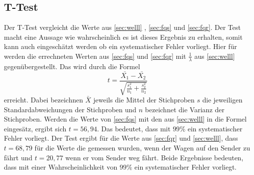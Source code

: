 \subsection{T-Test}
Der T-Test vergleicht die Werte aus \ref{sec:welll} , \ref{sec:fqs} und
\ref{sec:fqr}. Der Test macht eine Aussage wie wahrscheinlich es ist dieses
Ergebnis zu erhalten, somit kann auch eingeschätzt werden ob ein systematischer
Fehler vorliegt. Hier für werden die errechneten Werten aus \ref{sec:fqs}
und \ref{sec:fqr} mit $ \frac{1}{\lambda} $ aus \ref{sec:welll} gegenübergestellt.
Das wird durch die Formel
\begin{equation*}
  t = \frac{\bar{X_1} - \bar{X_2}}{\sqrt{\frac{s_1 ^2}{n_1} +
    \frac{s_2 ^2}{n_2}}}
\end{equation*}
erreicht. Dabei bezeichnen $ \bar{X}$ jeweils die Mittel der Stichproben
$s$ die jeweiligen Standardabweichungen der Stichproben und $n$ bezeichnet
die Varianz der Stichproben.
Werden die Werte von \ref{sec:fqs} mit den aus \ref{sec:welll} in die Formel
eingesätz, ergibt sich $ t = 56,94 $. Das bedeutet, dass mit $ 99 \% $ ein
systematischer Fehler vorliegt. Der Test ergibt für die Werte aus \ref{sec:fqr}
und \ref{sec:welll}, dass $ t = 68,79 $ für die Werte die gemessen wurden, wenn
der Wagen auf den Sender zu fährt und $ t = 20,77 $ wenn er vom Sender weg fährt.
Beide Ergebnisse bedeuten, dass mit einer Wahrscheinlichkeit von
$99\%$ ein systematischer Fehler vorliegt.



























%
